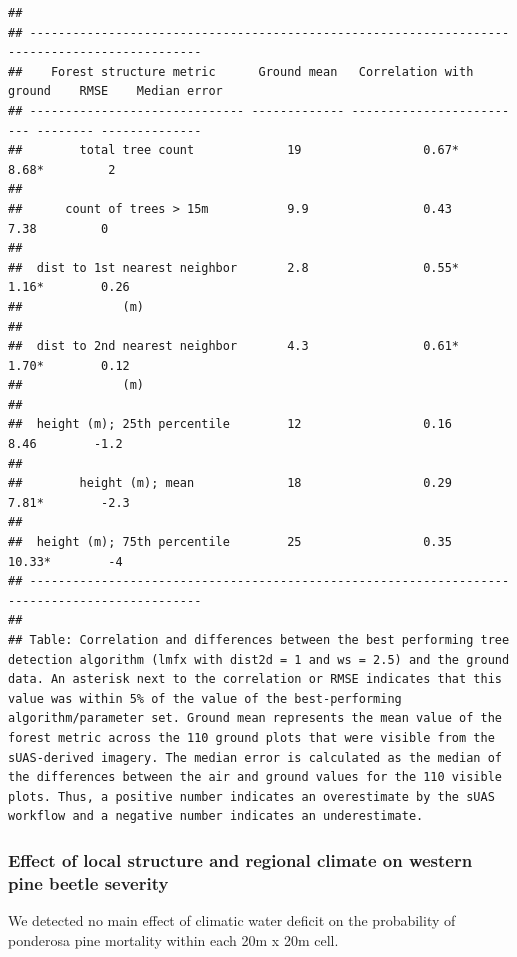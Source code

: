 \documentclass[]{article}
\begin{document}
\begin{verbatim}
## 
## ----------------------------------------------------------------------------------------------
##    Forest structure metric      Ground mean   Correlation with ground    RMSE    Median error 
## ------------------------------ ------------- ------------------------- -------- --------------
##        total tree count             19                 0.67*            8.68*         2       
## 
##      count of trees > 15m           9.9                0.43              7.38         0       
## 
##  dist to 1st nearest neighbor       2.8                0.55*            1.16*        0.26     
##              (m)                                                                              
## 
##  dist to 2nd nearest neighbor       4.3                0.61*            1.70*        0.12     
##              (m)                                                                              
## 
##  height (m); 25th percentile        12                 0.16              8.46        -1.2     
## 
##        height (m); mean             18                 0.29             7.81*        -2.3     
## 
##  height (m); 75th percentile        25                 0.35             10.33*        -4      
## ----------------------------------------------------------------------------------------------
## 
## Table: Correlation and differences between the best performing tree detection algorithm (lmfx with dist2d = 1 and ws = 2.5) and the ground data. An asterisk next to the correlation or RMSE indicates that this value was within 5% of the value of the best-performing algorithm/parameter set. Ground mean represents the mean value of the forest metric across the 110 ground plots that were visible from the sUAS-derived imagery. The median error is calculated as the median of the differences between the air and ground values for the 110 visible plots. Thus, a positive number indicates an overestimate by the sUAS workflow and a negative number indicates an underestimate.
\end{verbatim}

\subsubsection{Effect of local structure and regional climate on western
pine beetle
severity}\label{effect-of-local-structure-and-regional-climate-on-western-pine-beetle-severity}

We detected no main effect of climatic water deficit on the probability
of ponderosa pine mortality within each 20m x 20m cell.
\end{document}
